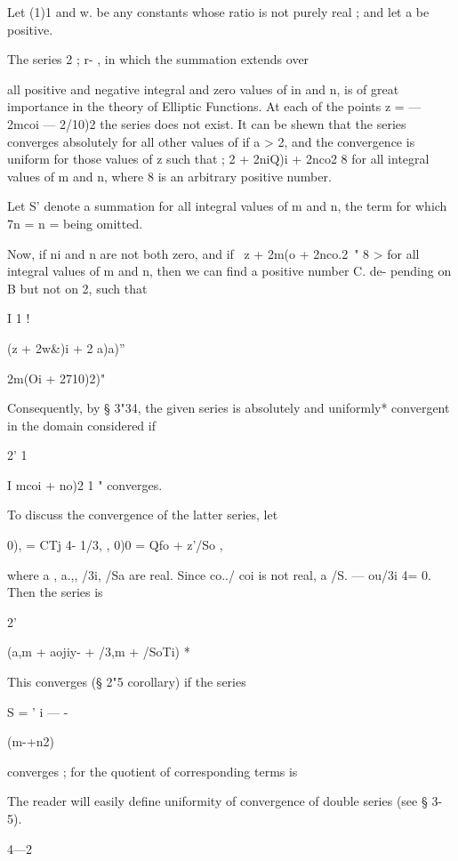 Let (1)1 and w.  be any constants whose ratio is not purely real ; and let 
a be positive. 

The series 2 ;   r- , in which the summation extends over 

all positive and negative integral and zero values of in and n, is of great 
importance in the theory of Elliptic Functions. At each of the points 
z = — 2mcoi — 2/10)2 the series does not exist. It can be shewn that the series 
converges absolutely for all other values of   if a > 2, and the convergence is 
uniform for those values of z such that ; 2 + 2niQ)i + 2nco2     8 for all integral 
values of m and n, where 8 is an arbitrary positive number. 

Let S' denote a summation for all integral values of m and n, the term for 
which 7n = n = being omitted. 

Now, if ni and n are not both zero, and if \ z + 2m(o  + 2nco.2\ "  8 > for 
all integral values of m and n, then we can find a positive number C. de- 
pending on B but not on 2, such that 

I 1 ! 



(z + 2w\&)i + 2 a)a)'' 



 2m(Oi + 2710)2)" 



Consequently, by § 3"34, the given series is absolutely and uniformly* 
convergent in the domain considered if 

2' 1 

I mcoi + no)2 1 " 
converges. 

To discuss the convergence of the latter series, let 

0), = CTj 4- 1/3, , 0)0 = Qfo + z'/So , 

where a , a.,, /3i, /Sa are real. Since co../ coi is not real, a /S. — ou/3i 4= 0. Then 
the series is 

2'   

 (a,m + aojiy- +  /3,m + /SoTi)   * 

This converges (§ 2"5 corollary) if the series 

S =  ' i — - 

(m-+n2)   

converges ; for the quotient of corresponding terms is 

The reader will easily define uniformity of convergence of double series (see § 3-5). 

4—2 



